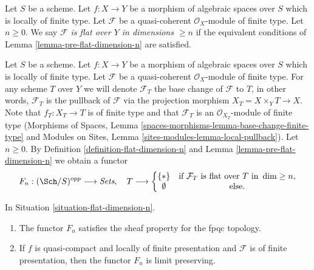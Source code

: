 \begin{definition}
\label{definition-flat-dimension-n}
Let $S$ be a scheme. Let $f : X \to Y$ be a morphism of algebraic spaces
over $S$ which is locally of finite type.
Let $\mathcal{F}$ be a quasi-coherent $\mathcal{O}_X$-module of finite type.
Let $n \geq 0$.
We say {\it $\mathcal{F}$ is flat over $Y$ in dimensions $\geq n$}
if the equivalent conditions of Lemma \ref{lemma-pre-flat-dimension-n}
are satisfied.
\end{definition}

\begin{situation}
\label{situation-flat-dimension-n}
Let $S$ be a scheme. Let $f : X \to Y$ be a morphism of algebraic spaces
over $S$ which is locally of finite type. Let $\mathcal{F}$ be a quasi-coherent
$\mathcal{O}_X$-module of finite type. For any scheme $T$ over $Y$ we will
denote $\mathcal{F}_T$ the base change of $\mathcal{F}$ to $T$, in other words,
$\mathcal{F}_T$ is the pullback of $\mathcal{F}$ via the projection morphism
$X_T = X \times_Y T \to X$. Note that $f_T : X_T \to T$ is of finite type
and that $\mathcal{F}_T$ is an $\mathcal{O}_{X_T}$-module of finite type
(Morphisms of Spaces, Lemma
\ref{spaces-morphisms-lemma-base-change-finite-type}
and
Modules on Sites, Lemma \ref{sites-modules-lemma-local-pullback}).
Let $n \geq 0$. By Definition \ref{definition-flat-dimension-n} and
Lemma \ref{lemma-pre-flat-dimension-n} we obtain a functor
\begin{equation}
\label{equation-flat-dimension-n}
F_n : (\Sch/S)^{opp} \longrightarrow \textit{Sets}, \quad
T \longrightarrow \left\{
\begin{matrix}
\{*\} & \text{if }\mathcal{F}_T\text{ is flat over }T\text{ in }\dim \geq n, \\
\emptyset & \text{else.}
\end{matrix}
\right.
\end{equation}
\end{situation}

\begin{lemma}
\label{lemma-flat-dimension-n}
In Situation \ref{situation-flat-dimension-n}.
\begin{enumerate}
\item The functor $F_n$ satisfies the sheaf property for the fpqc topology.
\item If $f$ is quasi-compact and locally of finite presentation
and $\mathcal{F}$ is of finite presentation, then the functor $F_n$ is
limit preserving.
\end{enumerate}
\end{lemma}

